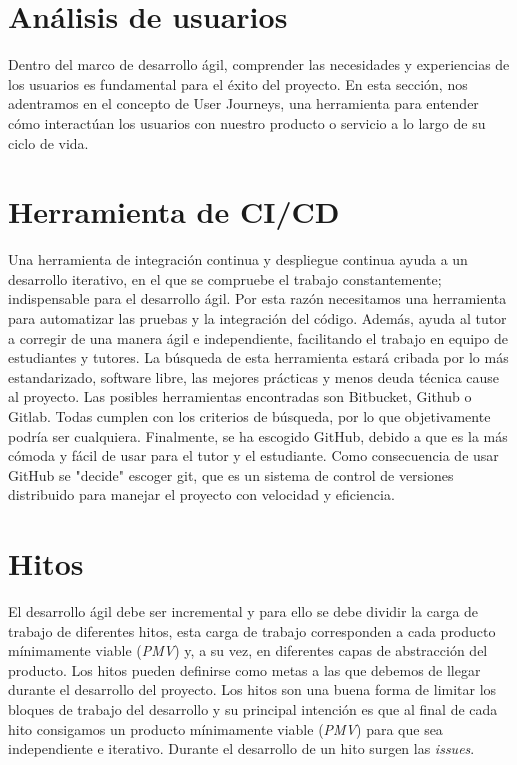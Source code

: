 \section{Análisis de usuarios}
Dentro del marco de desarrollo ágil, comprender las necesidades y experiencias de los usuarios es fundamental para el éxito del proyecto.
En esta sección, nos adentramos en el concepto de User Journeys, una herramienta para entender cómo interactúan los usuarios con nuestro producto o servicio a lo largo de su ciclo de vida.



\section{Herramienta de CI/CD}
Una herramienta de integración continua y despliegue continua ayuda a un desarrollo iterativo, en el que se compruebe el trabajo constantemente; indispensable para el desarrollo ágil.
Por esta razón necesitamos una herramienta para automatizar las pruebas y la integración del código. Además, ayuda al tutor a corregir de una manera ágil e independiente, facilitando el trabajo en equipo de estudiantes y tutores.
La búsqueda de esta herramienta estará cribada por lo más estandarizado, software libre, las mejores prácticas y menos deuda técnica cause al proyecto.
Las posibles herramientas encontradas son Bitbucket, Github o Gitlab. Todas cumplen con los criterios de búsqueda, por lo que objetivamente podría ser cualquiera.
Finalmente, se ha escogido GitHub, debido a que es la más cómoda y fácil de usar para el tutor y el estudiante.
Como consecuencia de usar GitHub se "decide" escoger git, que es un sistema de control de versiones distribuido para manejar el proyecto con velocidad y eficiencia.

\section{Hitos}
El desarrollo ágil debe ser incremental y para ello se debe dividir la carga de trabajo de diferentes hitos, esta carga
de trabajo corresponden a cada producto mínimamente viable (\textit{PMV}) y, a su vez, en diferentes capas de abstracción del producto.
Los hitos pueden definirse como metas a las que debemos de llegar durante el desarrollo del proyecto.
Los hitos son una buena forma de limitar los bloques de trabajo del desarrollo y su principal intención es que
al final de cada hito consigamos un producto mínimamente viable (\textit{PMV}) para que sea independiente e iterativo.
Durante el desarrollo de un hito surgen las \textit{issues}.

